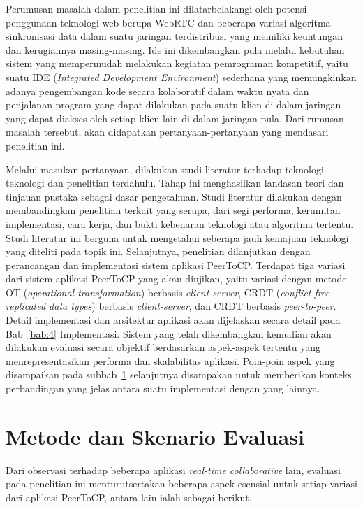 Perumusan masalah dalam penelitian ini dilatarbelakangi oleh potensi penggunaan teknologi web berupa WebRTC dan beberapa variasi algoritma sinkronisasi data dalam suatu jaringan terdistribusi yang memiliki keuntungan dan kerugiannya masing-masing. Ide ini dikembangkan pula melalui kebutuhan sistem yang mempermudah melakukan kegiatan pemrograman kompetitif, yaitu suatu IDE (\textit{Integrated Development Environment}) sederhana yang memungkinkan adanya pengembangan kode secara kolaboratif dalam waktu nyata dan penjalanan program yang dapat dilakukan pada suatu klien di dalam jaringan yang dapat diakses oleh setiap klien lain di dalam jaringan pula. Dari rumusan masalah tersebut, akan didapatkan pertanyaan-pertanyaan yang mendasari penelitian ini.

Melalui masukan pertanyaan, dilakukan studi literatur terhadap teknologi-teknologi dan penelitian terdahulu. Tahap ini menghasilkan landasan teori dan tinjauan pustaka sebagai dasar pengetahuan. Studi literatur dilakukan dengan membandingkan penelitian terkait yang serupa, dari segi performa, kerumitan implementasi, cara kerja, dan bukti kebenaran teknologi atau algoritma tertentu. Studi literatur ini berguna untuk mengetahui seberapa jauh kemajuan teknologi yang diteliti pada topik ini. Selanjutnya, penelitian dilanjutkan dengan perancangan dan implementasi sistem aplikasi PeerToCP. Terdapat tiga variasi dari sistem aplikasi PeerToCP yang akan diujikan, yaitu variasi dengan metode OT (\textit{operational transformation}) berbasis \textit{client-server}, CRDT (\textit{conflict-free replicated data types}) berbasis \textit{client-server}, dan CRDT berbasis \textit{peer-to-peer}. Detail implementasi dan arsitektur aplikasi akan dijelaskan secara detail pada Bab~\ref{bab:4} Implementasi. Sistem yang telah dikembangkan kemudian akan dilakukan evaluasi secara objektif berdasarkan aspek-aspek tertentu yang menrepresentasikan performa dan skalabilitas aplikasi. Poin-poin aspek yang disampaikan pada subbab~\ref{sec:evaluasi} selanjutnya disampakan untuk memberikan konteks perbandingan yang jelas antara suatu implementasi dengan yang lainnya.

\section{Metode dan Skenario Evaluasi}
\label{sec:evaluasi}

Dari observasi terhadap beberapa aplikasi \textit{real-time collaborative} lain, evaluasi pada penelitian ini menturutsertakan beberapa aspek esensial untuk setiap variasi dari aplikasi PeerToCP, antara lain ialah sebagai berikut.

